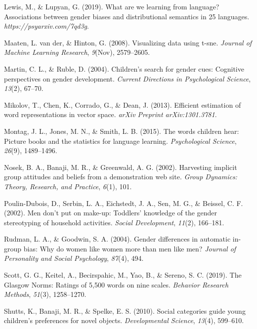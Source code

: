 \documentclass[
  english,
  ,man,floatsintext]{apa6}
\begin{document}
\leavevmode\hypertarget{ref-lewis2019we}{}%
Lewis, M., \& Lupyan, G. (2019). What are we learning from language? Associations between gender biases and distributional semantics in 25 languages. \emph{https://psyarxiv.com/7qd3g}.

\leavevmode\hypertarget{ref-maaten2008visualizing}{}%
Maaten, L. van der, \& Hinton, G. (2008). Visualizing data using t-sne. \emph{Journal of Machine Learning Research}, \emph{9}(Nov), 2579--2605.

\leavevmode\hypertarget{ref-martin2004children}{}%
Martin, C. L., \& Ruble, D. (2004). Children's search for gender cues: Cognitive perspectives on gender development. \emph{Current Directions in Psychological Science}, \emph{13}(2), 67--70.

\leavevmode\hypertarget{ref-mikolov2013efficient}{}%
Mikolov, T., Chen, K., Corrado, G., \& Dean, J. (2013). Efficient estimation of word representations in vector space. \emph{arXiv Preprint arXiv:1301.3781}.

\leavevmode\hypertarget{ref-montag2015words}{}%
Montag, J. L., Jones, M. N., \& Smith, L. B. (2015). The words children hear: Picture books and the statistics for language learning. \emph{Psychological Science}, \emph{26}(9), 1489--1496.

\leavevmode\hypertarget{ref-nosek2002harvesting}{}%
Nosek, B. A., Banaji, M. R., \& Greenwald, A. G. (2002). Harvesting implicit group attitudes and beliefs from a demonstration web site. \emph{Group Dynamics: Theory, Research, and Practice}, \emph{6}(1), 101.

\leavevmode\hypertarget{ref-poulin2002men}{}%
Poulin-Dubois, D., Serbin, L. A., Eichstedt, J. A., Sen, M. G., \& Beissel, C. F. (2002). Men don't put on make-up: Toddlers' knowledge of the gender stereotyping of household activities. \emph{Social Development}, \emph{11}(2), 166--181.

\leavevmode\hypertarget{ref-rudman2004gender}{}%
Rudman, L. A., \& Goodwin, S. A. (2004). Gender differences in automatic in-group bias: Why do women like women more than men like men? \emph{Journal of Personality and Social Psychology}, \emph{87}(4), 494.

\leavevmode\hypertarget{ref-scott2019glasgow}{}%
Scott, G. G., Keitel, A., Becirspahic, M., Yao, B., \& Sereno, S. C. (2019). The Glasgow Norms: Ratings of 5,500 words on nine scales. \emph{Behavior Research Methods}, \emph{51}(3), 1258--1270.

\leavevmode\hypertarget{ref-shutts2010social}{}%
Shutts, K., Banaji, M. R., \& Spelke, E. S. (2010). Social categories guide young children's preferences for novel objects. \emph{Developmental Science}, \emph{13}(4), 599--610.
\end{document}
